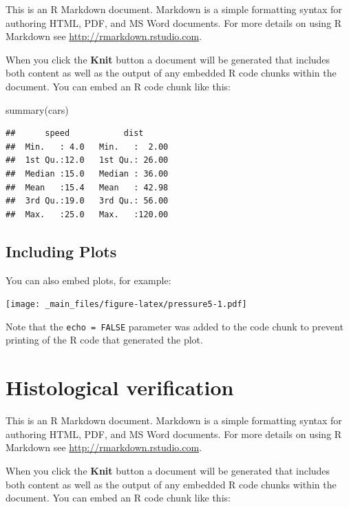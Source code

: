 \documentclass[
]{book}
\newenvironment{Shaded}{\begin{snugshade}}{\end{snugshade}}
\newcommand{\FunctionTok}[1]{\textcolor[rgb]{0.00,0.00,0.00}{#1}}
\newcommand{\NormalTok}[1]{#1}
\begin{document}
This is an R Markdown document. Markdown is a simple formatting syntax for authoring HTML, PDF, and MS Word documents. For more details on using R Markdown see \url{http://rmarkdown.rstudio.com}.

When you click the \textbf{Knit} button a document will be generated that includes both content as well as the output of any embedded R code chunks within the document. You can embed an R code chunk like this:

\begin{Shaded}
\begin{Highlighting}[]
\FunctionTok{summary}\NormalTok{(cars)}
\end{Highlighting}
\end{Shaded}

\begin{verbatim}
##      speed           dist       
##  Min.   : 4.0   Min.   :  2.00  
##  1st Qu.:12.0   1st Qu.: 26.00  
##  Median :15.0   Median : 36.00  
##  Mean   :15.4   Mean   : 42.98  
##  3rd Qu.:19.0   3rd Qu.: 56.00  
##  Max.   :25.0   Max.   :120.00
\end{verbatim}

\hypertarget{including-plots-2}{%
\section{Including Plots}\label{including-plots-2}}

You can also embed plots, for example:

\texttt{[image: \_main\_files/figure-latex/pressure5-1.pdf]}

Note that the \texttt{echo\ =\ FALSE} parameter was added to the code chunk to prevent printing of the R code that generated the plot.

\hypertarget{histological-verification}{%
\chapter{Histological verification}\label{histological-verification}}

This is an R Markdown document. Markdown is a simple formatting syntax for authoring HTML, PDF, and MS Word documents. For more details on using R Markdown see \url{http://rmarkdown.rstudio.com}.

When you click the \textbf{Knit} button a document will be generated that includes both content as well as the output of any embedded R code chunks within the document. You can embed an R code chunk like this:
\end{document}
